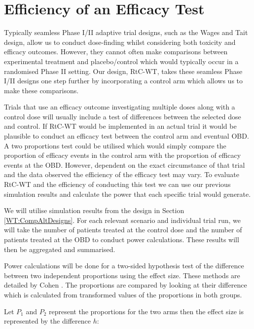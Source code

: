 \section{Efficiency of an Efficacy Test}
\label{WT:Efficiency-Efficacy-Test}

Typically seamless Phase \RN{1}/\RN{2} adaptive trial designs, such as the Wages and Tait design, allow us to conduct dose-finding whilst considering both toxicity and efficacy outcomes. However, they cannot often make comparisons between experimental treatment and placebo/control which would typically occur in a randomised Phase \RN{2} setting. Our design, RtC-WT, takes these seamless Phase \RN{1}/\RN{2} designs one step further by incorporating a control arm which allows us to make these comparisons. 

Trials that use an efficacy outcome investigating multiple doses along with a control dose will usually include a test of differences between the selected dose and control. If RtC-WT would be implemented in an actual trial it would be plausible to conduct an efficacy test between the control arm and eventual OBD. A two proportions test \cite{patnaikPowerFunctionTest1948} could be utilised which would simply compare the proportion of efficacy events in the control arm with the proportion of efficacy events at the OBD. However, dependent on the exact circumstance of that trial and the data observed the efficiency of the efficacy test may vary. To evaluate RtC-WT and the efficiency of conducting this test we can use our previous simulation results and calculate the power that each specific trial would generate.  

We will utilise simulation results from the design in Section \ref{WT:CompAltDesigns}. For each relevant scenario and individual trial run, we will take the number of patients treated at the control dose and the number of patients treated at the OBD to conduct power calculations. These results will then be aggregated and summarised.  

Power calculations will be done for a two-sided hypothesis test of the difference between two independent proportions using the effect size. These methods are detailed by Cohen \cite{cohenStatisticalPowerAnalysis1988}. The proportions are compared by looking at their difference which is calculated from transformed values of the proportions in both groups.

Let $P_{1}$ and $P_{2}$ represent the proportions for the two arms then the effect size is represented by the difference $h$: 

